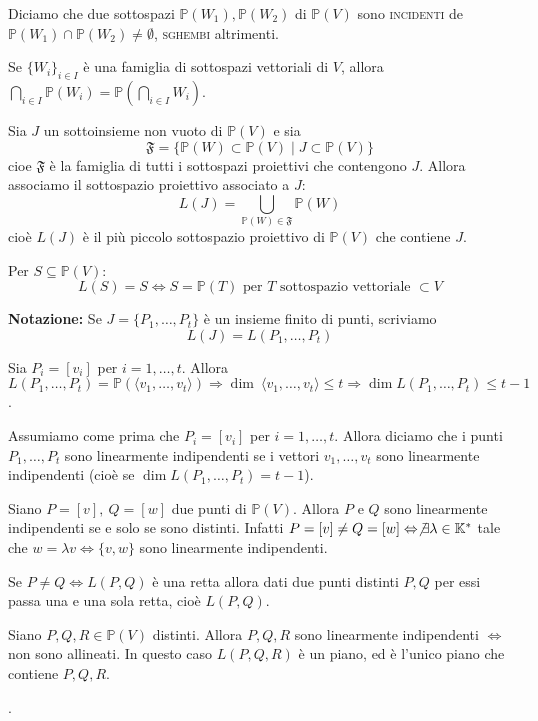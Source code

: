 \begin{defn}
  Diciamo che due sottospazi $\mathbb{P}(W_1), \mathbb{P}(W_2)$ di $\mathbb{P}(V)$ sono \textsc{incidenti} de $\mathbb{P}(W_1) \cap \mathbb{P}(W_2) \not=\emptyset$, \textsc{sghembi} altrimenti.
\end{defn}

\begin{oss}
  \begin{nlist}
    \item Se $\{W_i\}_{i \in I}$ è una famiglia di sottospazi vettoriali di $V$, allora $\displaystyle \bigcap_{i \in I} \mathbb{P}(W_i)=\mathbb{P}\left(\bigcap_{i \in I}W_i\right)$.
    \item Sia $J$ un sottoinsieme non vuoto di $\mathbb{P}(V)$ e sia
    $$\mathfrak{F}=\{\mathbb{P}(W) \subset \mathbb{P}(V) \mid J \subset \mathbb{P}(V)\}$$
    cioe $\mathfrak{F}$ è la famiglia di tutti i sottospazi proiettivi che contengono $J$. Allora associamo il sottospazio proiettivo 				associato a $J$:
    $$L(J)=\bigcup _{\mathbb{P}(W) 	\in \mathfrak{F}} \mathbb{P}(W)$$
    cioè $L(J)$ è il più piccolo sottospazio proiettivo di $\mathbb{P}(V)$ che contiene $J$.
    \item Per $S \subseteq \mathbb{P}(V)$:
    $$L(S)=S \Leftrightarrow S=\mathbb{P}(T) \text{ per }T\text{ sottospazio vettoriale }\subset V$$
    \item \textbf{Notazione:} Se $J=\{P_1,\dots,P_t\}$ è un insieme finito di punti, scriviamo
    $$L(J)=L(P_1,\dots,P_t)$$
    \item Sia $P_i=[v_i]$ per $i=1,\dots,t$. Allora $L(P_1,\dots,P_t)=\mathbb{P}(\langle v_1,\dots,v_t \rangle) \Rightarrow \dim \				\langle v_1,\dots,v_t \rangle \le t \Rightarrow \dim L(P_1,\dots,P_t) \le t-1$.
  \end{nlist}
\end{oss}

\begin{defn}
Assumiamo come prima che $P_i=[v_i]$ per $i=1,\dots,t$. Allora diciamo che i punti $P_1,\dots,P_t$ sono linearmente indipendenti se i vettori $v_1,\dots,v_t$ sono linearmente indipendenti (cioè se $\dim L(P_1,\dots,P_t)=t-1$).
\end{defn}

\begin{oss}
  \begin{nlist}
	\item Siano $P=[v],\ Q=[w]$ due punti di $\mathbb{P}(V)$. Allora $P$ e $Q$ sono linearmente indipendenti se e solo se sono 				distinti. Infatti $P=[v]\neq Q=[w] \Leftrightarrow \not\exists \lambda \in \mathbb{K}^*$ tale che $w=\lambda v \Leftrightarrow \{v,w\}$ sono linearmente indipendenti.
	\item Se $P \neq Q \Leftrightarrow L(P,Q)$ è una retta allora dati due punti distinti $P,Q$ per essi passa una e una sola retta, cioè 		$L(P,Q)$.
	\item Siano $P,Q,R \in \mathbb{P}(V)$ distinti. Allora $P,Q,R$ sono linearmente indipendenti $\Leftrightarrow$ non sono allineati. 	In questo caso $L(P,Q,R)$ è un piano, ed è l'unico piano che contiene $P,Q,R$.
  \end{nlist}.
\end{oss}

